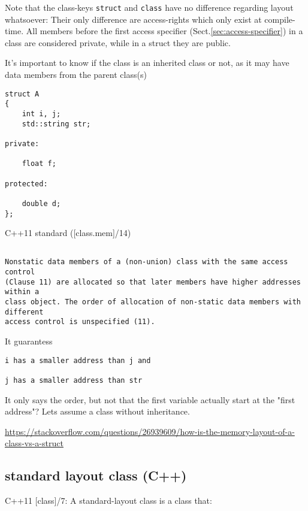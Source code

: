 Note that the class-keys \verb!struct! and \verb!class! have no difference
regarding layout whatsoever: Their only difference are access-rights which only
exist at compile-time. All members before the first access specifier (Sect.\ref{sec:access-specifier}) in a class are considered private,
while in a struct they are public.
 

It's important to know if the class is an inherited class or not, as it may have data members from the parent class(s)



\begin{verbatim}
struct A
{
    int i, j;
    std::string str;

private:

    float f;

protected:

    double d;
};
\end{verbatim}

C++11 standard ([class.mem]/14)
\begin{verbatim}

Nonstatic data members of a (non-union) class with the same access control
(Clause 11) are allocated so that later members have higher addresses within a
class object. The order of allocation of non-static data members with different
access control is unspecified (11).

\end{verbatim}
It guarantess
\begin{verbatim}
i has a smaller address than j and

j has a smaller address than str

\end{verbatim}

It only says the order, but not that the first variable actually start at the
"first address"? Lets assume a class without inheritance.

\url{https://stackoverflow.com/questions/26939609/how-is-the-memory-layout-of-a-class-vs-a-struct}

\subsection{standard layout class (C++)}
\label{sec:memory-layout-standard-layout-class}

C++11 [class]/7: A standard-layout class is a class that:

